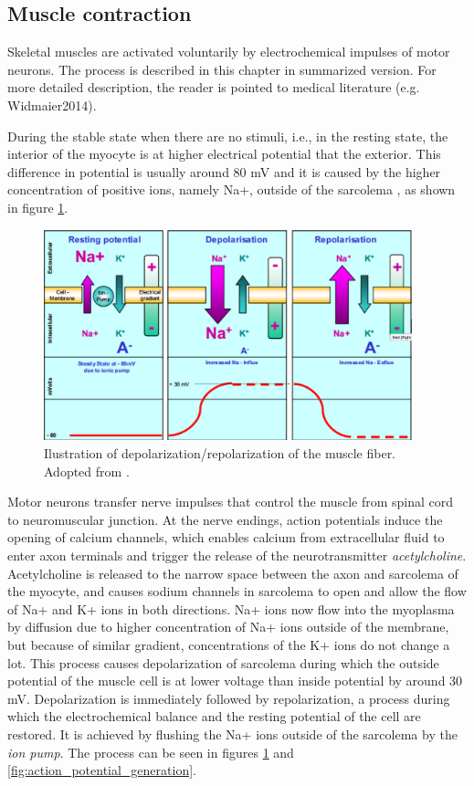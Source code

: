 \subsection{Muscle contraction} \label{sc:contraction}

Skeletal muscles are activated voluntarily by electrochemical impulses of motor neurons. The process is described in this chapter in summarized version. For more detailed description, the reader is pointed to medical literature (e.g. {Widmaier2014}).

During the stable state when there are no stimuli, i.e., in the resting state, the interior of the myocyte is at higher electrical potential that the exterior. This difference in potential is usually around 80 mV and it is caused by the higher concentration of positive ions, namely Na+, outside of the sarcolema \citep{Nazmi2016}, as shown in figure \ref{fig:depolarization}.

\begin{figure}[ht]
\centering
\includegraphics[width=0.95\textwidth]{Images/introduction/Depolarization.png}
\caption{Ilustration of depolarization/repolarization of the muscle fiber. Adopted from \citet{Nazmi2016}.}
\label{fig:depolarization}
\end{figure}

Motor neurons transfer nerve impulses that control the muscle from spinal cord to neuromuscular junction. At the nerve endings, action potentials induce the opening of calcium channels, which enables calcium from extracellular fluid to enter axon terminals and trigger the release of the neurotransmitter \emph{acetylcholine}. Acetylcholine is released to the narrow space between the axon and sarcolema of the myocyte, and causes sodium channels in sarcolema to open and allow the flow of Na+ and K+ ions in both directions. Na+ ions now flow into the myoplasma by diffusion due to higher concentration of Na+ ions outside of the membrane, but because of similar gradient, concentrations of the K+ ions do not change a lot. This process causes depolarization of sarcolema during which the outside potential of the muscle cell is at lower voltage than inside potential by around 30 mV. Depolarization is immediately followed by repolarization, a process during which the electrochemical balance and the resting potential of the cell are restored. It is achieved by flushing the Na+ ions outside of the sarcolema by the \emph{ion pump}. The process can be seen in figures \ref{fig:depolarization} and \ref{fig:action_potential_generation}.
  
